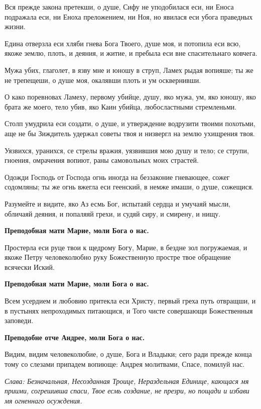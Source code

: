 Вся прежде закона претекши, о душе, Сифу не уподобилася еси, ни Еноса подражала еси, ни Еноха преложением, ни Ноя, но явилася еси убога праведных жизни.


Едина отверзла еси хляби гнева Бога Твоего, душе моя, и потопила еси всю, якоже землю, плоть, и деяния, и житие, и пребыла еси вне спасительнаго ковчега.


Мужа убих, глаголет, в язву мне и юношу в струп, Ламех рыдая вопияше; ты же не трепещеши, о душе моя, окалявши плоть и ум осквернивши.


О како поревновах Ламеху, первому убийце, душу, яко мужа, ум, яко юношу, яко брата же моего, тело убив, яко Каин убийца, любосластными стремленьми.


Столп умудрила еси создати, о душе, и утверждение водрузити твоими похотьми, аще не бы Зиждитель удержал советы твоя и низвергл на землю ухищрения твоя.


Уязвихся, уранихся, се стрелы вражия, уязвившия мою душу и тело; се струпи, гноения, омрачения вопиют, раны самовольных моих страстей.


Одожди Господь от Господа огнь иногда на беззаконие гневающее, сожег содомляны; ты же огнь вжегла еси геенский, в немже имаши, о душе, сожещися.


Разумейте и видите, яко Аз есмь Бог, испытаяй сердца и умучаяй мысли, обличаяй деяния, и попаляяй грехи, и судяй сиру, и смирену, и нищу.


\bfseries Преподобная мати Марие, моли Бога о нас.


\normalfont{}Простерла еси руце твои к щедрому Богу, Марие, в бездне зол погружаемая, и якоже Петру человеколюбно руку Божественную простре твое обращение всячески Иский.


\bfseries Преподобная мати Марие, моли Бога о нас.\normalfont{}


Всем усердием и любовию притекла еси Христу, первый греха путь отвращши, и в пустынях непроходимых питающися, и Того чисте совершающи Божественныя заповеди.


\bfseries Преподобне отче Андрее, моли Бога о нас.\normalfont{}


Видим, видим человеколюбие, о душе, Бога и Владыки; сего ради прежде конца тому со слезами припадем вопиюще: Андрея молитвами, Спасе, помилуй нас.


\itshape Слава\normalfont{}: Безначальная, Несозданная Троице, Нераздельная Единице, кающася мя приими, согрешивша спаси, Твое есмь создание, не презри, но пощади и избави мя огненнаго осуждения.


